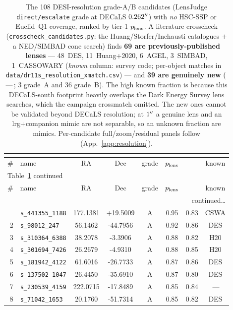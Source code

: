 \begin{longtable}{rlcccccc}
\caption{The 108 DESI-resolution grade-A/B candidates (LensJudge \texttt{direct/escalate} grade at DECaLS $0.262^{\prime\prime}$) with \emph{no} HSC-SSP or Euclid~Q1 coverage, ranked by tier-1 $p_{\rm lens}$. A literature crosscheck (\texttt{crosscheck\_candidates.py}: the Huang/Storfer/Inchausti catalogues $+$ a NED/SIMBAD cone search) finds \textbf{69 are previously-published lenses} --- 48~DES, 11~Huang+2020, 6~AGEL, 3~SIMBAD, 1~CASSOWARY (\emph{known} column: survey code; per-object matches in \texttt{data/dr11s\_resolution\_xmatch.csv}) --- and \textbf{39 are genuinely new} (\,---\,; 3 grade~A and 36 grade~B). The high known fraction is because this DECaLS-south footprint heavily overlaps the Dark Energy Survey lens searches, which the campaign crossmatch omitted. The new ones cannot be validated beyond DECaLS resolution; at $1^{\prime\prime}$ a genuine lens and an lrg+companion mimic are not separable, so an unknown fraction are mimics. Per-candidate full/zoom/residual panels follow (App.~\ref{app:resolution}).}\\
\label{tab:resolution}\\
\toprule
\# & name & RA & Dec & grade & $p_{\rm lens}$ & \vb{} & known \\
\midrule
\endfirsthead
\multicolumn{8}{l}{\footnotesize Table~\ref{tab:resolution} continued}\\
\toprule
\# & name & RA & Dec & grade & $p_{\rm lens}$ & \vb{} & known \\
\midrule
\endhead
\midrule\multicolumn{8}{r}{\footnotesize continued\ldots}\\
\endfoot
\bottomrule
\endlastfoot
1 & \texttt{s\_441355\_1188} & 177.1381 & +19.5009 & A & 0.95 & 0.83 & CSWA \\
2 & \texttt{s\_98012\_247} & 56.1462 & -44.7956 & A & 0.92 & 0.86 & DES \\
3 & \texttt{s\_310364\_6388} & 38.2078 & -3.3906 & A & 0.88 & 0.82 & H20 \\
4 & \texttt{s\_301694\_7426} & 26.2679 & -4.9310 & A & 0.88 & 0.85 & H20 \\
5 & \texttt{s\_181942\_4122} & 61.6016 & -26.7733 & A & 0.87 & 0.86 & DES \\
6 & \texttt{s\_137502\_1047} & 26.4450 & -35.6910 & A & 0.87 & 0.80 & DES \\
7 & \texttt{s\_230539\_4159} & 222.0715 & -17.8489 & A & 0.85 & 0.84 & \,--- \\
8 & \texttt{s\_71042\_1653} & 20.1760 & -51.7314 & A & 0.85 & 0.82 & DES \\

\end{longtable}
